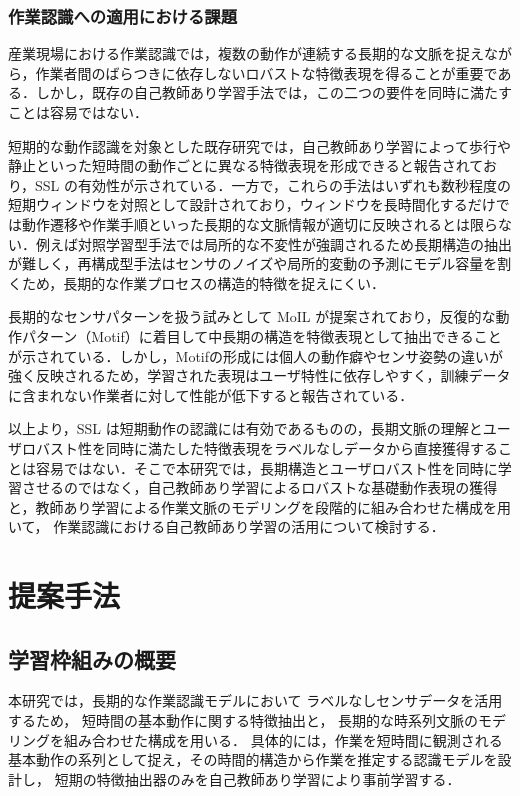 \documentclass[submit]{ipsj}
\newcommand{\rev}[1]{{\color{red}#1}}
\begin{document}
{\subsubsection{作業認識への適用における課題}
産業現場における作業認識では，複数の動作が連続する長期的な文脈を捉えながら，作業者間のばらつきに依存しないロバストな特徴表現を得ることが重要である．しかし，既存の自己教師あり学習手法では，この二つの要件を同時に満たすことは容易ではない．

短期的な動作認識を対象とした既存研究では，自己教師あり学習によって歩行や静止といった短時間の動作ごとに異なる特徴表現を形成できると報告されており，SSL の有効性が示されている\cite{saeed2019multi,  xu2021limu}．一方で，これらの手法はいずれも数秒程度の短期ウィンドウを対照として設計されており，ウィンドウを長時間化するだけでは動作遷移や作業手順といった長期的な文脈情報が適切に反映されるとは限らない．例えば対照学習型手法では局所的な不変性が強調されるため長期構造の抽出が難しく，再構成型手法はセンサのノイズや局所的変動の予測にモデル容量を割くため\cite{logacjov2024self}，長期的な作業プロセスの構造的特徴を捉えにくい．

長期的なセンサパターンを扱う試みとして MoIL\cite{xia2024preliminary} が提案されており，反復的な動作パターン（Motif）に着目して中長期の構造を特徴表現として抽出できることが示されている．しかし，Motifの形成には個人の動作癖やセンサ姿勢の違いが強く反映されるため，学習された表現はユーザ特性に依存しやすく，訓練データに含まれない作業者に対して性能が低下すると報告されている．

以上より，SSL は短期動作の認識には有効であるものの，長期文脈の理解とユーザロバスト性を同時に満たした特徴表現をラベルなしデータから直接獲得することは容易ではない．そこで本研究では，長期構造とユーザロバスト性を同時に学習させるのではなく，自己教師あり学習によるロバストな基礎動作表現の獲得と，\rev{教師あり学習による作業文脈のモデリングを段階的に組み合わせた構成を用いて，
作業認識における自己教師あり学習の活用について検討する．}


\section{提案手法}
\subsection{学習枠組みの概要}

本研究では，\rev{長期的な作業認識モデルにおいて
ラベルなしセンサデータを活用するため，
短時間の基本動作に関する特徴抽出と，
長期的な時系列文脈のモデリングを組み合わせた構成を用いる．
具体的には，}作業を短時間に観測される基本動作の系列として捉え，その時間的構造から作業を推定する認識モデルを設計し，
\rev{短期の特徴抽出器のみを自己教師あり学習により事前学習する．}

}
\end{document}
